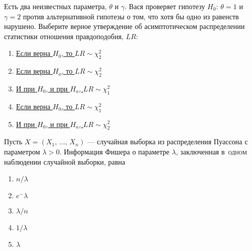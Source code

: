 \documentclass[t]{beamer}
\begin{document}
 \begin{frame} \label{20} 
\begin{block}{20} 

    Есть два неизвестных параметра, $\theta$ и $\gamma$. Вася проверяет гипотезу $H_0$: $\theta = 1$ и $\gamma = 2$ против альтернативной гипотезы о том, что хотя бы одно из равенств нарушено. Выберите верное утверждение об асимптотическом распределении статистики отношения правдоподобия, $LR$:


 \end{block} 
\begin{enumerate} 
\item[] \hyperlink{20-Yes}{\beamergotobutton{} Если верна $H_0$, то $LR \sim \chi_2^2$}
\item[] \hyperlink{20-No}{\beamergotobutton{} Если верна $H_a$, то $LR \sim \chi_2^2$}
\item[] \hyperlink{20-No}{\beamergotobutton{} И при $H_0$, и при $H_a$, $LR \sim \chi_1^2$}
\item[] \hyperlink{20-No}{\beamergotobutton{} Если верна $H_0$, то $LR \sim \chi_1^2$}
\item[] \hyperlink{20-No}{\beamergotobutton{} И при $H_0$, и при $H_a$, $LR \sim \chi_2^2$}
\end{enumerate} 
\end{frame} 


 \begin{frame} \label{21} 
\begin{block}{21} 

  Пусть $X = (X_1, \, \ldots, \, X_n)$ — случайная выборка из распределения Пуассона с параметром $\lambda > 0$. Информация Фишера о параметре $\lambda$, заключенная в~\textsc{одном} наблюдении случайной выборки, равна


 \end{block} 
\begin{enumerate} 
\item[] \hyperlink{21-No}{\beamergotobutton{}  $n / \lambda$}
\item[] \hyperlink{21-No}{\beamergotobutton{} $e^-\lambda$}
\item[] \hyperlink{21-No}{\beamergotobutton{} $\lambda / n$}
\item[] \hyperlink{21-Yes}{\beamergotobutton{} $1 / \lambda$}
\item[] \hyperlink{21-No}{\beamergotobutton{} $\lambda$}
\end{enumerate} 
\end{frame} 
\end{document}
